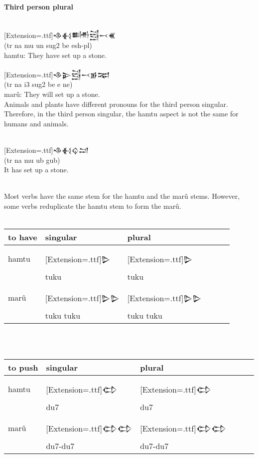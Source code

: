 \documentclass[a4paper,12pt]{book}
\newcommand{\fcm}{\large\setmainfont{Akkadian}[Extension=.ttf]}
\begin{document}
\paragraph{Third person plural}\verb||\\
{\fcm 𒈾𒈬𒌦𒁻𒁁𒌍}\\
(tr na mu un sug2 be esh-pl)\\
hamtu: They have set up a stone.\\

\verb||\\
{\fcm 𒈾𒉌𒁻𒁁𒂊𒉈}\\
(tr na i3 sug2 be e ne)\\
marû: They will set up a stone.\\

\newpage
Animals and plants have different pronouns
for the third person singular. Therefore,
in the third person singular, the hamtu aspect
is not the same for humans and animals.

\verb||\\
{\fcm 𒈾𒈬𒌒𒁺}\\
(tr na mu ub gub)\\
It has set up a stone.

\verb||\\
Most verbs have the same stem for the hamtu
and the marû stems. However, some verbs reduplicate
the hamtu stem to form the marû.\\


\verb||\\
\begin{tabular}[!h]{l | l l l l l}
  to have & singular & plural\\
  \hline\\
  hamtu   &\fcm 𒌇 &\fcm 𒌇\\
  & tuku    & tuku\\
  \hline\\
  marû &\fcm 𒌇𒌇 &\fcm 𒌇𒌇\\
       & tuku tuku    & tuku tuku\\
\end{tabular}\verb||\\

\verb||\\
\begin{tabular}[!h]{l | l l l l l}
  to push & singular & plural\\
  \hline\\
  hamtu   &\fcm 𒌌 &\fcm 𒌌\\
  & du7    & du7\\
  \hline\\
  marû &\fcm 𒌌𒌌 &\fcm 𒌌𒌌\\
       & du7-du7     & du7-du7\\
\end{tabular}\verb||\\
\end{document}
